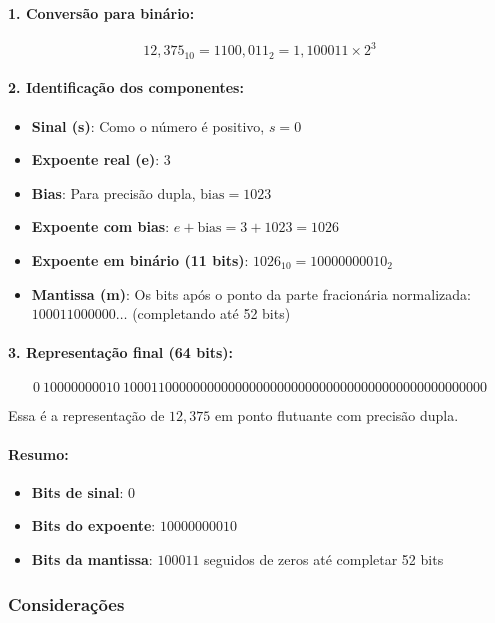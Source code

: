 \paragraph{1. Conversão para binário:}

\[
12{,}375_{10} = 1100{,}011_2 = 1{,}100011 \times 2^3
\]

\paragraph{2. Identificação dos componentes:}

\begin{itemize}
  \item \textbf{Sinal (s)}: Como o número é positivo, \( s = 0 \)
  \item \textbf{Expoente real (e)}: \( 3 \)
  \item \textbf{Bias}: Para precisão dupla, \( \text{bias} = 1023 \)
  \item \textbf{Expoente com bias}: \( e + \text{bias} = 3 + 1023 = 1026 \)
  \item \textbf{Expoente em binário (11 bits)}: \( 1026_{10} = 10000000010_2 \)
  \item \textbf{Mantissa (m)}: Os bits após o ponto da parte fracionária normalizada: \( 100011000000\ldots \) (completando até 52 bits)
\end{itemize}

\paragraph{3. Representação final (64 bits):}

\[
\boxed{
0\ 10000000010\ 1000110000000000000000000000000000000000000000000000
}
\]

\noindent Essa é a representação de \( 12{,}375 \) em ponto flutuante com precisão dupla.

\paragraph{Resumo:}
\begin{itemize}
  \item \textbf{Bits de sinal}: \( 0 \)
  \item \textbf{Bits do expoente}: \( 10000000010 \)
  \item \textbf{Bits da mantissa}: \( 100011 \) seguidos de zeros até completar 52 bits
\end{itemize}


\subsubsection*{Considerações}

